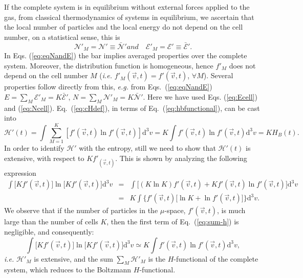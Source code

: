 If the complete system is in equilibrium without external forces applied to
the gas, from classical thermodynamics of
systems in equilibrium, we ascertain that the local number
of particles and the local
energy do not depend on the cell number, on a statistical sense, this is
%
\begin{subequations}\label{eq:eqNandE}
\begin{equation}
   \mathcal{N}'_M=\mathcal{N}'\equiv \bar{\mathcal{N}}'
\end{equation}
%
and
%
\begin{equation}
   \quad\mathcal{E}'_M=\mathcal{E}'\equiv\bar{\mathcal{E}}'.
\end{equation}
\end{subequations}
%
In Eqs. (\ref{eq:eqNandE}) the bar implies averaged properties over the complete system.
Moreover, the distribution function is homogeneous, hence $f'_M$
does not depend on the cell number $M$ (\textit{i.e.} $f'_M(\vec v,t)=f'(\vec v,t)$,
$\forall M$). Several properties follow directly from this, \textit{e.g.}
from Eqs.~(\ref{eq:eqNandE}) $E=\sum_M\mathcal{E}'_M=K\bar{\mathcal{E}}'$, $N=\sum_M\mathcal{N}'_M=K\bar{\mathcal{N}}'$. Here we have used Eqs. (\ref{eq:Ecell}) and (\ref{eq:Ncell}).
Eq.~(\ref{eq:cHdef}), in terms of Eq.~(\ref{eq:hbfunctional}), can be cast into
%
\begin{equation}
    \mathcal{H}'(t)=\int \sum_{M=1}^{K} [f'(\vec{v},t)\ln f'(\vec{v},t)] \mathrm{d}^{3}v
         = K\int  f'(\vec{v},t) \ln f'(\vec{v},t) \mathrm{d}^{3}v= K H_{B}(t).
\end{equation}
%
In order to identify $\mathcal{H}'$ with the entropy, still we need to show that $\mathcal{H}'(t)$ is extensive,
with respect to $Kf'_(\vec v,t)$.
This is shown by analyzing the following expression
%
\begin{eqnarray}\label{eq:sum-h}
    \int \big[Kf'(\vec{v},t)\big] \ln \big[Kf'(\vec{v},t)\big] \mathrm{d}^{3}v & = & 
        \int \big[(K\ln K)f'(\vec{v},t) + Kf'(\vec{v},t) \ln f'(\vec{v},t)\big]\mathrm{d}^{3}v\nonumber\\
        & = & K\int\Big\{ f'(\vec{v},t)\big[\ln K + \ln f'(\vec{v},t)\big] \Big\}\mathrm{d}^{3}v.
\end{eqnarray}
%
We observe that if the number of particles in the $\mu$-space, $f'(\vec{v},t)$, is much large than
the number of cells $K$, then the first term of Eq.~(\ref{eq:sum-h}) is negligible, and consequently:
%
\begin{equation}\label{aditive-property}
    \int \big[Kf'(\vec{v},t)\big] \ln \big[Kf'(\vec{v},t)\big] \mathrm{d}^{3}v \simeq
    K\int f'(\vec{v},t) \ln f'(\vec{v},t) \mathrm{d}^{3}v,
\end{equation}
%
\textit{i.e.} $\mathcal{H}'_M$ is extensive, and the sum $\sum_M\mathcal{H}'_M$ is the $H$-functional of the complete
system, which reduces to the Boltzmann $H$-functional.

